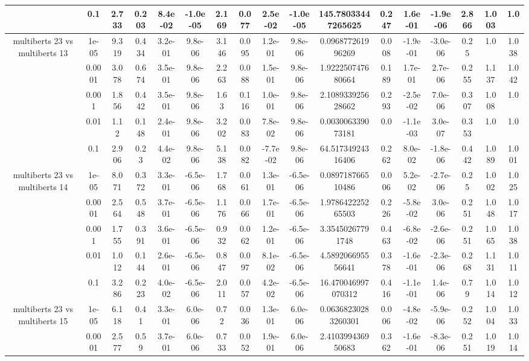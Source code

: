 \begin{tabular}{|c|c|c|c|c|c|c|c|c|c|c|c|c|c|c|c|c|}
 & 0.1 & 2.733 & 0.203 & 8.4e-02 & -1.0e-05 & 2.169 & 0.077 & 2.5e-02 & -1.0e-05 & 145.78033447265625 & 0.247 & 1.6e-01 & -1.9e-06 & 2.866 & 1.003 & 1.0 \\
\hline
\multirow{5}{*}{multiberts 23 vs multiberts 13} & 1e-05 & 9.319 & 0.434 & 3.2e-01 & 9.8e-06 & 3.146 & 0.095 & 1.2e-01 & 9.8e-06 & 0.096877261996269 & 0.008 & -1.9e-01 & -3.0e-06 & 0.25 & 1.0 & 1.038 \\
 & 0.0001 & 3.078 & 0.674 & 3.5e-01 & 9.8e-06 & 2.263 & 0.088 & 1.5e-01 & 9.8e-06 & 1.922250747680664 & 0.189 & 1.7e-01 & 2.7e-06 & 0.255 & 1.137 & 1.042 \\
 & 0.001 & 1.856 & 0.442 & 3.5e-01 & 9.8e-06 & 1.63 & 0.116 & 1.0e-01 & 9.8e-06 & 2.108933925628662 & 0.293 & -2.5e-02 & 7.0e-06 & 0.307 & 1.008 & 1.0 \\
 & 0.01 & 1.12 & 0.148 & 2.4e-01 & 9.8e-06 & 3.202 & 0.083 & 7.8e-02 & 9.8e-06 & 0.003006339073181 & 0.0 & -1.1e-03 & 3.0e-07 & 0.353 & 1.0 & 1.0 \\
 & 0.1 & 2.906 & 0.23 & 4.4e-02 & 9.8e-06 & 5.138 & 0.082 & -7.7e-02 & 9.8e-06 & 64.51734924316406 & 0.262 & 8.0e-02 & -1.8e-06 & 0.442 & 1.089 & 1.001 \\
\hline
\multirow{5}{*}{multiberts 23 vs multiberts 14} & 1e-05 & 8.071 & 0.372 & 3.3e-01 & -6.5e-06 & 1.768 & 0.061 & 1.3e-01 & -6.5e-06 & 0.089718766510486 & 0.006 & 5.2e-02 & -2.7e-06 & 0.25 & 1.002 & 1.025 \\
 & 0.0001 & 2.564 & 0.548 & 3.7e-01 & -6.5e-06 & 1.176 & 0.066 & 1.7e-01 & -6.5e-06 & 1.978642225265503 & 0.226 & -5.8e-02 & 3.0e-06 & 0.251 & 1.048 & 1.017 \\
 & 0.001 & 1.755 & 0.391 & 3.6e-01 & -6.5e-06 & 0.932 & 0.062 & 1.2e-01 & -6.5e-06 & 3.35450267791748 & 0.463 & -6.8e-02 & -2.6e-06 & 0.251 & 1.065 & 1.038 \\
 & 0.01 & 1.012 & 0.144 & 2.6e-01 & -6.5e-06 & 0.847 & 0.097 & 8.1e-02 & -6.5e-06 & 4.589206695556641 & 0.378 & -1.6e-01 & -2.3e-06 & 0.268 & 1.131 & 1.011 \\
 & 0.1 & 3.286 & 0.223 & 4.0e-02 & -6.5e-06 & 2.011 & 0.057 & 4.2e-02 & -6.5e-06 & 16.470046997070312 & 0.416 & -1.1e-01 & 1.4e-06 & 0.79 & 1.014 & 1.012 \\
\hline
\multirow{5}{*}{multiberts 23 vs multiberts 15} & 1e-05 & 6.118 & 0.41 & 3.3e-01 & 6.0e-06 & 0.72 & 0.036 & 1.3e-01 & 6.0e-06 & 0.06368230283260301 & 0.006 & -4.8e-02 & -5.9e-06 & 0.252 & 1.004 & 1.033 \\
 & 0.0001 & 2.577 & 0.59 & 3.7e-01 & 6.0e-06 & 0.733 & 0.052 & 1.9e-01 & 6.0e-06 & 2.410399436950683 & 0.362 & -1.6e-01 & -8.3e-06 & 0.251 & 1.019 & 1.014 \\

\end{tabular}
